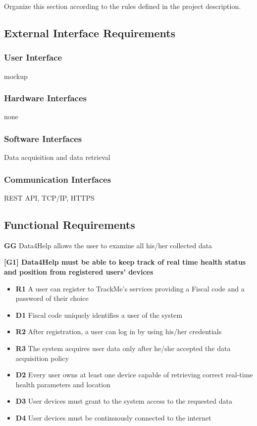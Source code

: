 Organize this section according to the rules defined in the project description. 
\subsection{External Interface Requirements}
\subsubsection{User Interface}
mockup
\subsubsection{Hardware Interfaces}
none
\subsubsection{Software Interfaces}
Data acquisition and data retrieval
\subsubsection{Communication Interfaces}
REST API, TCP/IP, HTTPS
\subsection{Functional Requirements}
\textbf{GG} Data4Help allows the user to examine all his/her collected data

\textbf{[G1] Data4Help must be able to keep track of real time health status and position from registered users' devices}
\begin{itemize}
\item \textbf{R1} A user can register to TrackMe's services providing a Fiscal code and a password of their choice
\item \textbf{D1} Fiscal code uniquely identifies a user of the system
\item \textbf{R2} After registration, a user can log in by using his/her credentials
\item \textbf{R3} The system acquires user data only after he/she accepted the data acquisition policy
\item \textbf{D2} Every user owns at least one device capable of retrieving correct real-time health parameters and location
\item \textbf{D3} User devices must grant to the system access to the requested data
\item \textbf{D4} User devices must be continuously connected to the internet
\end{itemize}

